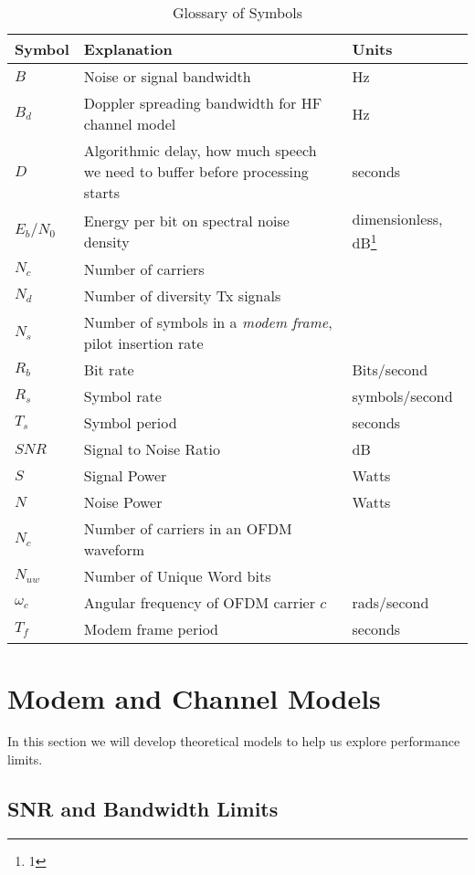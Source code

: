 \documentclass{article}
\begin{document}
\begin{table}[h]
\centering
\begin{tabular}{l m{6cm} l}
 \hline
 Symbol & Explanation & Units \\
 \hline
 $B$ & Noise or signal bandwidth & Hz \\
 $B_d$ & Doppler spreading bandwidth for HF channel model & Hz \\
 $D$ & Algorithmic delay, how much speech we need to buffer before processing starts & seconds \\
 $E_b/N_0$ & Energy per bit on spectral noise density & dimensionless, dB\footnote{1} \\
 $N_c$ & Number of carriers  \\
 $N_d$ & Number of diversity Tx signals  \\
 $N_s$ & Number of symbols in a \emph{modem frame}, pilot insertion rate  \\
 $R_b$ & Bit rate & Bits/second \\
 $R_s$ & Symbol rate & symbols/second \\
 $T_s$ & Symbol period & seconds \\
 $SNR$ & Signal to Noise Ratio & dB \\
 $S$ & Signal Power & Watts \\
 $N$ & Noise Power & Watts \\
 $N_c$ & Number of carriers in an OFDM waveform \\
 $N_{uw}$ & Number of Unique Word bits \\
 $\omega_c$ & Angular frequency of OFDM carrier $c$ & rads/second \\ 
 $T_f$ & Modem frame period & seconds \\
 \hline
\end{tabular}
\caption{Glossary of Symbols}
\end{table}


\clearpage

\section{Modem and Channel Models}

In this section we will develop theoretical models to help us explore performance limits.

\subsection{SNR and Bandwidth Limits}
\end{document}
